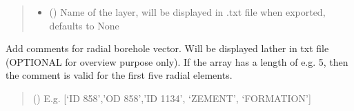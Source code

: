 \documentclass[letterpaper,10pt,english]{sphinxmanual}
\begin{document}
\begin{fulllineitems}
\begin{fulllineitems}
\begin{quote}
\begin{description}
\begin{itemize}
\item {} 
\sphinxAtStartPar
{} (\sphinxstyleliteralemphasis{\sphinxupquote{, }}) \textendash{} Name of the layer, will be displayed in .txt file when exported, defaults to None

\end{itemize}

\end{description}\end{quote}

\end{fulllineitems}


\begin{fulllineitems}
\label{\detokenize{tscw_module:tscw_module.tscw_DataClassesInput.GacaFieldData.add_radialComment}}
\pysigstartsignatures
{}
\pysigstopsignatures
\sphinxAtStartPar
Add comments for radial borehole vector. Will be displayed lather in txt file (OPTIONAL \sphinxhyphen{} for overview purpose only).
If the array has a length of e.g. 5, then the comment is valid for the first five radial elements.
\begin{quote}\begin{description}
\sphinxAtStartPar
{} () \textendash{} E.g. {[}‘ID 858’,’OD 858’,’ID 1134’, ‘ZEMENT’, ‘FORMATION’{]}

\end{description}\end{quote}

\end{fulllineitems}



\end{fulllineitems}
\end{document}
